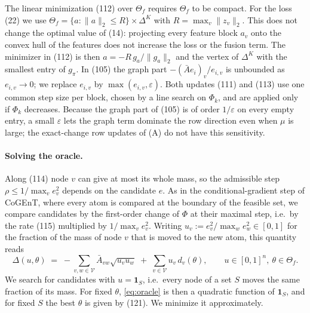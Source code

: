 The linear minimization (112) over $\Theta_f$ requires $\Theta_f$ to be compact. For the loss (22)
we use $\Theta_f=\{a:\|a\|_2\le R\}\times\Delta^K$ with $R=\max_v\|z_v\|_2$. This does not change
the optimal value of (14): projecting every feature block $a_v$ onto the convex hull of the
features does not increase the loss or the fusion term. The minimizer in (112) is then
$a=-R\,g_a/\|g_a\|_2$ and the vertex of $\Delta^K$ with the smallest entry of $g_\pi$. In (105)
the graph part $-(\bar A e_i)_v/e_{i,v}$ is unbounded as $e_{i,v}\to0$; we replace $e_{i,v}$ by
$\max(e_{i,v},\varepsilon)$. Both updates (111) and (113) use one common step size per block,
chosen by a line search on $\Phi_k$, and are applied only if $\Phi_k$ decreases. Because the graph
part of (105) is of order $1/\varepsilon$ on every empty entry, a small $\varepsilon$ lets the
graph term dominate the row direction even when $\mu$ is large; the exact-change row updates of
(A) do not have this sensitivity.

\paragraph{Solving the oracle.}
Along (114) node $v$ can give at most its whole mass, so the admissible step
$\rho\le 1/\max_v e_v^2$ depends on the candidate $e$. As in the conditional-gradient step of
CoGEnT, where every atom is compared at the boundary of the feasible set, we compare candidates
by the first-order change of $\Phi$ at their maximal step, i.e.\ by the rate (115) multiplied
by $1/\max_v e_v^2$. Writing $u_v := e_v^2/\max_w e_w^2\in[0,1]$ for the fraction of the mass
of node $v$ that is moved to the new atom, this quantity reads
\begin{equation}
  \Delta(u,\theta) \;=\; -\sum_{v,w\in\mathcal V}\bar A_{vw}\sqrt{u_v u_w}
  \;+\;\sum_{v\in\mathcal V} u_v\, d_v(\theta),
  \qquad u\in[0,1]^n,\ \theta\in\Theta_f .
  \label{eq:oracle}
\end{equation}
We search for candidates with $u=\mathbf 1_S$, i.e.\ every node of a set $S$ moves the same
fraction of its mass. For fixed $\theta$, \eqref{eq:oracle} is then a quadratic function of
$\mathbf 1_S$, and for fixed $S$ the best $\theta$ is given by (121). We minimize it approximately.

